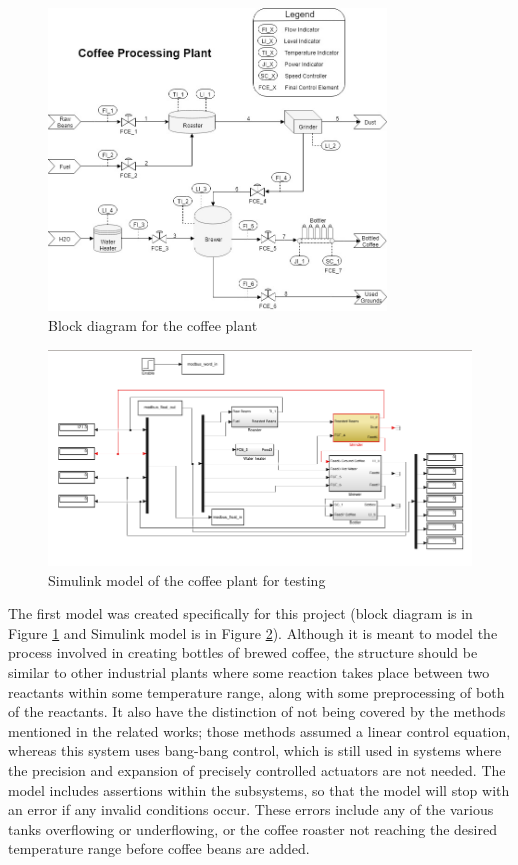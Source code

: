 \documentclass[10pt,twocolumn]{IEEEtran}
\begin{document}
\begin{figure}
  \centering
  \includegraphics[width=0.8\textwidth]{coffee.png}
  \caption{Block diagram for the coffee plant}
  \label{fig:coffee}
\end{figure}

\begin{figure}
  \centering
  \includegraphics[width=\textwidth]{coffee_simulink.png}
  \caption{Simulink model of the coffee plant for testing}
  \label{fig:coffee_simulink}
\end{figure}

The first model was created specifically for this project (block diagram is in Figure \ref{fig:coffee} and Simulink model is in Figure \ref{fig:coffee_simulink}).
Although it is meant to model the process involved in creating bottles of brewed coffee, the structure should be similar to other industrial plants where some reaction takes place between two reactants within some temperature range, along with some preprocessing of both of the reactants.
It also have the distinction of not being covered by the methods mentioned in the related works; those methods assumed a linear control equation, whereas this system uses bang-bang control, which is still used in systems where the precision and expansion of precisely controlled actuators are not needed.
The model includes assertions within the subsystems, so that the model will stop with an error if any invalid conditions occur.
These errors include any of the various tanks overflowing or underflowing, or the coffee roaster not reaching the desired temperature range before coffee beans are added.
\end{document}

